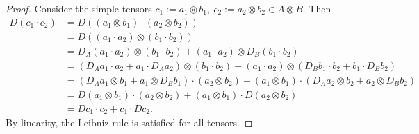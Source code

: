 \begin{proof}
  Consider the simple tensors
  $c_1 := a_1 \otimes b_1,\ c_2 := a_2 \otimes b_2 \in A \otimes B$.
  Then
  \begin{equation}
    \begin{split}
      D(c_1 \cdot c_2)
      & = D((a_1 \otimes b_1) \cdot (a_2 \otimes b_2)) \\
      & = D((a_1 \cdot a_2) \otimes (b_1 \cdot b_2)) \\
      & = D_A(a_1 \cdot a_2) \otimes (b_1 \cdot b_2)
        + (a_1 \cdot a_2) \otimes D_B(b_1 \cdot b_2) \\
      & = (D_A a_1 \cdot a_2 + a_1 \cdot D_A a_2) \otimes (b_1 \cdot b_2)
        + (a_1 \cdot a_2) \otimes (D_B b_1 \cdot b_2 + b_1 \cdot D_B b_2) \\
      & = (D_A a_1 \otimes b_1 + a_1 \otimes D_B b_1) \cdot (a_2 \otimes b_2)
        + (a_1 \otimes b_1) \cdot (D_A a_2 \otimes b_2 + a_2 \otimes D_B b_2) \\
      & = D(a_1 \otimes b_1) \cdot (a_2 \otimes b_2)
        + (a_1 \otimes b_1) \cdot D(a_2 \otimes b_2) \\
      & = D c_1 \cdot c_2 + c_1 \cdot D c_2.
    \end{split}
  \end{equation}
  By linearity, the Leibniz rule is satisfied for all tensors.
\end{proof}
